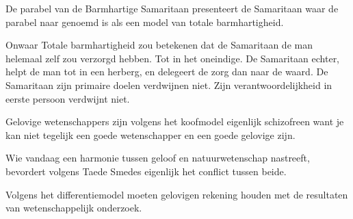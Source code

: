 \documentclass[main.tex]{subfiles}
\begin{document}
\begin{examenvraag}
    \begin{stelling}
        De parabel van de Barmhartige Samaritaan presenteert de Samaritaan waar de parabel naar genoemd is als een model van totale barmhartigheid.
    \end{stelling}

    \begin{stelling-antwoord}{Onwaar}
        Totale barmhartigheid zou betekenen dat de Samaritaan de man helemaal zelf zou verzorgd hebben.
        Tot in het oneindige.
        De Samaritaan echter, helpt de man tot in een herberg, en delegeert de zorg dan naar de waard.
        De Samaritaan zijn primaire doelen verdwijnen niet.
        Zijn verantwoordelijkheid in eerste persoon verdwijnt niet.
    \end{stelling-antwoord}
\end{examenvraag}


\begin{examenvraag}
    \begin{stelling}
        Gelovige wetenschappers zijn volgens het koofmodel eigenlijk schizofreen want je kan niet tegelijk een goede wetenschapper en een goede gelovige zijn.
    \end{stelling}

    \begin{antwoord}
    \end{antwoord}
\end{examenvraag}


\begin{examenvraag}
    \begin{stelling}
        Wie vandaag een harmonie tussen geloof en natuurwetenschap nastreeft, bevordert volgens Taede Smedes eigenlijk het conflict tussen beide.
    \end{stelling}

    \begin{antwoord}
    \end{antwoord}
\end{examenvraag}


\begin{examenvraag}
    \begin{stelling}
        Volgens het differentiemodel moeten gelovigen rekening houden met de resultaten van wetenschappelijk onderzoek.
    \end{stelling}

    \begin{antwoord}
    \end{antwoord}
\end{examenvraag}
\end{document}
